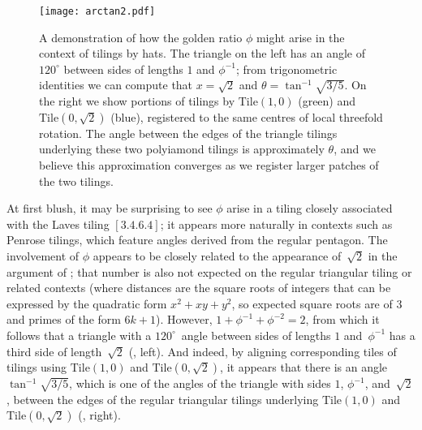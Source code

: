 \begin{figure}[ht!]
\begin{center}
\texttt{[image: arctan2.pdf]}
\end{center}
\caption{\label{fig:arctan}
	A demonstration of how the golden ratio $\phi$ might arise in
	the context of tilings by hats.  The triangle on the left has
	an angle of $120^\circ$ between sides of lengths $1$ and $\phi^{-1}$;
	from trigonometric identities we can compute that $x=\sqrt{2}$ and
	$\theta=\tan^{-1}\sqrt{3/5}$.  On the right we show portions
	of tilings by $\mathrm{Tile}(1,0)$ (green) and $\mathrm{Tile}(0,\sqrt{2})$
	(blue), registered to the same centres of local threefold rotation.
	The angle between the edges of the triangle tilings underlying these
	two polyiamond tilings is approximately $\theta$, and we believe this
	approximation converges as we register larger patches of the two
	tilings.}
\end{figure}

At first blush, it may be surprising to see $\phi$ arise
in a tiling closely associated with the Laves tiling $[3.4.6.4]$; it
appears more naturally in contexts such as Penrose tilings, which feature
angles derived from the regular pentagon.
The involvement of $\phi$ appears to be closely related to the
appearance of~$\sqrt{2}$ in the argument of ;
that number is also not expected on the regular triangular tiling or
related contexts (where distances are the square roots of integers
that can be expressed by the quadratic form $x^2+xy+y^2$, so expected
square roots are of $3$ and primes of the form $6k+1$).  However, $1 +
\phi^{-1} + \phi^{-2} = 2$, from which it follows that a triangle with a
$120^\circ$~angle between sides of lengths $1$ and~$\phi^{-1}$ has
a third side of length~$\sqrt{2}$ (, left).  And indeed,
by aligning corresponding tiles of tilings using
$\mathrm{Tile}(1,0)$ and $\mathrm{Tile}(0,\sqrt{2})$,
it appears that there is an angle
$\tan^{-1}\sqrt{3/5}$, which is one of the angles of the triangle with
sides $1$, $\phi^{-1}$, and~$\sqrt{2}$, between the edges of the
regular triangular tilings underlying $\mathrm{Tile}(1,0)$ and
$\mathrm{Tile}(0,\sqrt{2})$ (, right).

